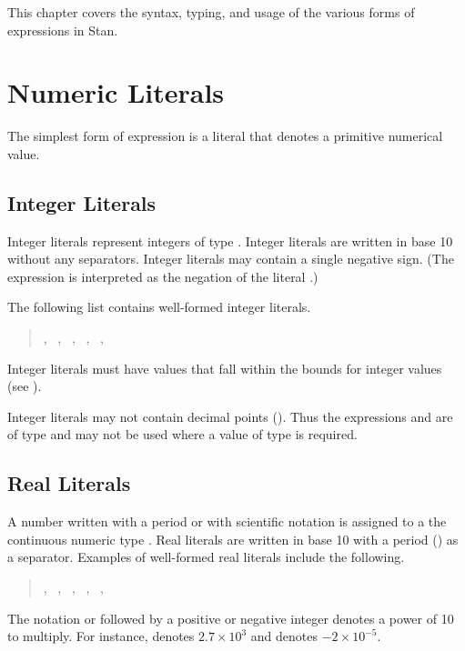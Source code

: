 This chapter covers the syntax, typing, and usage of the various forms
of expressions in Stan.

\section{Numeric Literals}

The simplest form of expression is a literal that denotes a primitive
numerical value.

\subsection{Integer Literals}

Integer literals represent integers of type .  Integer
literals are written in base 10 without any separators.  Integer
literals may contain a single negative sign.  (The expression
 is interpreted as the negation of the literal .)

The following list contains well-formed integer literals.
%
\begin{quote}
, \ , \ , \ ,
\ , \ 
\end{quote}
%
Integer literals must have values that fall within the bounds for
integer values (see ).

Integer literals may not contain decimal points ().  Thus the
expressions  and  are of type  and may
not be used where a value of type  is required.

\subsection{Real Literals}

A number written with a period or with scientific notation is assigned
to a the continuous numeric type .  Real literals are
written in base 10 with a period () as a separator.  Examples
of well-formed real literals include the following.
%
\begin{quote}
, \ , \ , \ , \
, \ 
\end{quote}
%
The notation  or  followed by a positive or negative
integer denotes a power of 10 to multiply.  For instance, 
denotes $2.7 \times 10^3$ and \code{-2E-5} denotes $-2 \times
10^{-5}$.


